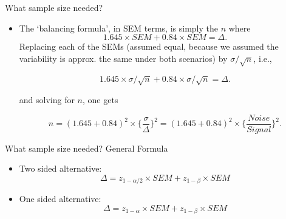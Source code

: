 \documentclass[10pt]{beamer}\usepackage[]{graphicx}\usepackage[]{color}
\begin{document}
\begin{frame}{What sample size needed?}
	
	\begin{itemize}
		\setlength\itemsep{1em}
		\item The `balancing formula', in SEM terms, is simply the $n$ where
		$$ 1.645 \times SEM + 0.84 \times SEM = \Delta.$$
		Replacing each of the  SEMs (assumed equal, because we assumed the variability
		is approx. the same under both scenarios) by $\sigma/\sqrt{n}$,  i.e.,
		
		$$ 1.645 \times \sigma/\sqrt{n} + 0.84 \times \sigma/\sqrt{n} = \Delta.$$
		
		and solving for $n$, one gets
		
		$$  n = (1.645 + 0.84)^2  \times \bigg\{ \frac{\sigma}{\Delta} \bigg\}^2 = 
		(1.645 + 0.84)^2  \times \bigg\{ \frac{Noise}{Signal} \bigg\}^2 .$$
	\end{itemize}
	
\end{frame}

\begin{frame}{What sample size needed? General Formula}
	
	\begin{itemize}
		\setlength\itemsep{2em}
		\item Two sided alternative:
		$$\Delta = z_{1-\alpha/2} \times SEM + z_{1-\beta} \times SEM$$
		
		\item One sided alternative:
		$$\Delta = z_{1-\alpha} \times SEM + z_{1-\beta} \times SEM$$
	\end{itemize}
	
\end{frame}
\end{document}
